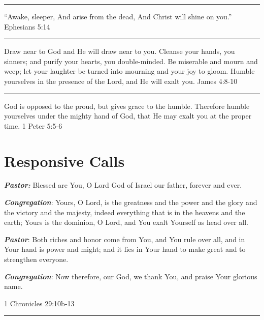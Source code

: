 \documentclass[]{book}
\begin{document}
\begin{center}\rule{0.5\linewidth}{\linethickness}\end{center}

``Awake, sleeper,
And arise from the dead,
And Christ will shine on you.'' \textbar{} Ephesians 5:14

\begin{center}\rule{0.5\linewidth}{\linethickness}\end{center}

Draw near to God and He will draw near to you. Cleanse your hands, you sinners; and purify your hearts, you double-minded. Be miserable and mourn and weep; let your laughter be turned into mourning and your joy to gloom. Humble yourselves in the presence of the Lord, and He will exalt you. \textbar{} James 4:8-10

\begin{center}\rule{0.5\linewidth}{\linethickness}\end{center}

God is opposed to the proud, but gives grace to the humble. Therefore humble yourselves under the mighty hand of God, that He may exalt you at the proper time. \textbar{} 1 Peter 5:5-6

\hypertarget{responsive-calls}{%
\section*{Responsive Calls}\label{responsive-calls}}

\textbf{\emph{Pastor:}} Blessed are You, O Lord God of Israel our father, forever and ever.

\textbf{\emph{Congregation}}: Yours, O Lord, is the greatness and the power and the glory and the victory and the majesty, indeed everything that is in the heavens and the earth; Yours is the dominion, O Lord, and You exalt Yourself as head over all.

\textbf{\emph{Pastor}}: Both riches and honor come from You, and You rule over all, and in Your hand is power and might; and it lies in Your hand to make great and to strengthen everyone.

\textbf{\emph{Congregation}}: Now therefore, our God, we thank You, and praise Your glorious name.

\textbar{} 1 Chronicles 29:10b-13 \textbar{}

\begin{center}\rule{0.5\linewidth}{\linethickness}\end{center}
\end{document}
